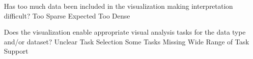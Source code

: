 \documentclass[a4paper,12pt]{article}
\begin{document}
	{Has too much data been included in the visualization making 
    	interpretation difficult? } 
	{\choice Too Sparse}
	{\choice Expected}
	{\choice Too Dense} 
        
	{Does the visualization enable appropriate visual analysis tasks for 
    	the data type and/or dataset?}
	{\choice Unclear Task Selection} 
    {\choice Some Tasks Missing} 
    {\choice Wide Range of Task Support}
        
\EndTable  
        
\end{document}
